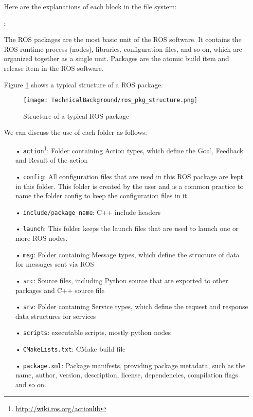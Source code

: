 Here are the explanations of each block in the file system:
\begin{description}[leftmargin=0in, labelindent=0pt]
\item[Package]: {The ROS packages are the most basic unit of the ROS software. It contains the ROS runtime process (nodes), libraries, configuration files, and so on, which are organized together as a single unit. Packages are the atomic build item and release item in the ROS software.

Figure \ref{fig:ros_pkg_struct} shows a typical structure of a ROS package.

\begin{figure}[h!]
  \centering
  \texttt{[image: TechnicalBackground/ros\_pkg\_structure.png]}
  \caption{Structure of a typical ROS package}
  \label{fig:ros_pkg_struct}
\end{figure}


We can discuss the use of each folder as follows:
\begin{itemize}%
\item[•] \texttt{action}\footnote{\url{http://wiki.ros.org/actionlib}}: Folder containing Action types, which define the Goal, Feedback and Result of the action
\item[•] \texttt{config}: All configuration files that are used in this ROS package are kept in this folder. This folder is created by the user and is a common practice to name the folder config to keep the configuration files in it.
\item[•] \texttt{include/package\_name}: C++ include headers
\item[•] \texttt{launch}: This folder keeps the launch files that are used to launch one or more ROS nodes.
\item[•] \texttt{msg}: Folder containing Message types, which define the structure of data for messages sent via ROS
\item[•] \texttt{src}: Source files, including Python source that are exported to other packages and C++ source file
\item[•] \texttt{srv}: Folder containing Service types,  which define the request and response data structures for services
\item[•] \texttt{scripts}: executable scripts, mostly python nodes
\item[•] \texttt{CMakeLists.txt}: CMake build file
\item[•] \texttt{package.xml}: Package manifests, providing package metadata, such as the name, author, version, description, license, dependencies, compilation flags and so on. 
\end{itemize}

}
\end{description}

